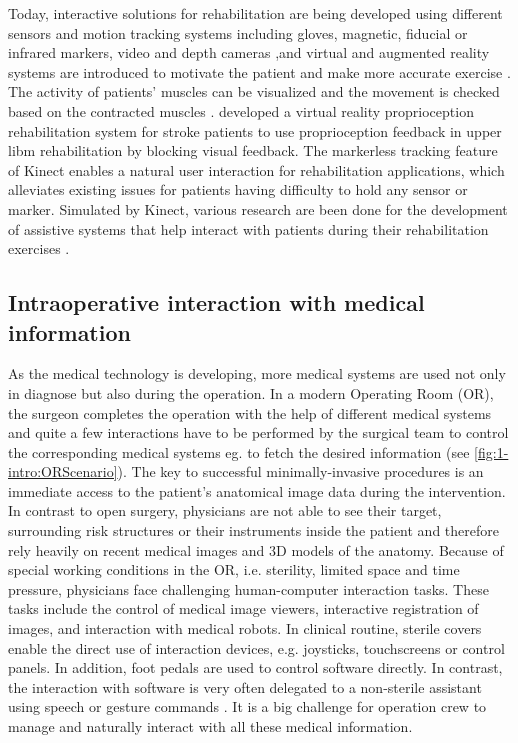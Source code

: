 Today, interactive solutions for rehabilitation are being developed using different sensors and motion tracking systems including gloves, magnetic, fiducial or infrared markers, video and depth cameras ,and virtual and augmented reality systems are introduced to motivate the patient and make more accurate exercise \cite{DaGama2015,Cho2014}. 
The activity of patients' muscles can be visualized and the movement is checked based on the contracted muscles \cite{Woodford2007}. \citet{Cho2014} developed a virtual reality proprioception rehabilitation system for stroke patients to use proprioception feedback in upper libm rehabilitation by blocking visual feedback.
The markerless tracking feature of Kinect enables a natural user interaction for rehabilitation applications, which alleviates existing issues for patients having difficulty to hold any sensor or marker. Simulated by Kinect, various research are been done for the development of assistive systems that help interact with patients during their rehabilitation exercises \cite{Cordella2012, Gama2012a, Anton2013, Borghese2013}.

\subsection{Intraoperative interaction with medical information}
As the medical technology is developing, more medical systems are used not only in diagnose but also during the operation. In a modern Operating Room (OR), the surgeon completes the operation with the help of different medical systems and quite a few interactions have to be performed by the surgical team to control the corresponding medical systems eg. to fetch the desired information (see \figurename{\ref{fig:1-intro:ORScenario}}).
The key to successful minimally-invasive procedures is an immediate access to the patient's anatomical image data during the intervention. In contrast to open surgery, physicians are not able to see their target, surrounding risk structures or their instruments inside the patient and therefore rely heavily on recent medical images and 3D models of the anatomy. Because of special working conditions in the OR, i.e. sterility, limited space and time pressure, physicians face challenging human-computer interaction tasks. These tasks include the control of medical image viewers, interactive registration of images, and interaction with medical robots. In clinical routine, sterile covers enable the direct use of interaction devices, e.g. joysticks, touchscreens or control panels. In addition, foot pedals are used to control software directly. In contrast, the interaction with software is very often delegated to a non-sterile assistant using speech or gesture commands \cite{Hubler2014}.
It is a big challenge for operation crew to manage and naturally interact with all these medical information.

